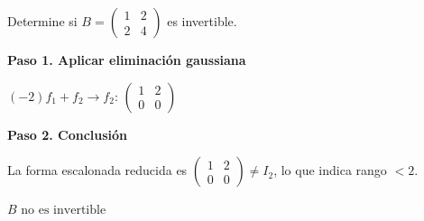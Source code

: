 \begin{example}
Determine si $B = \begin{pmatrix} 1 & 2 \\ 2 & 4 \end{pmatrix}$ es invertible.
\begin{myproof}
\textbf{Paso 1. Aplicar eliminación gaussiana}

$(-2)f_1 + f_2 \to f_2$: $\begin{pmatrix} \boxed{1} & 2 \\ 0 & 0 \end{pmatrix}$

\textbf{Paso 2. Conclusión}

La forma escalonada reducida es $\begin{pmatrix} 1 & 2 \\ 0 & 0 \end{pmatrix} \neq I_2$, lo que indica rango $< 2$.

$\boxed{B \text{ no es invertible}}$
\end{myproof}
\end{example}
